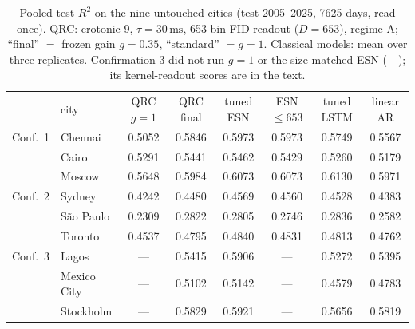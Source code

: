 \documentclass[aps,prresearch,preprint,superscriptaddress,amsmath,amssymb,floatfix]{revtex4-2}
\newcommand{\SI}[2]{\ensuremath{#1\,\mathrm{#2}}}
\begin{document}
\begin{table}[t]
\caption{\label{tab:confirmR2}Pooled test $R^2$ on the nine untouched cities (test
2005--2025, 7625 days, read once). QRC: crotonic-9, $\tau=\SI{30}{ms}$, 653-bin FID
readout ($D=653$), regime A; ``final'' $=$ frozen gain $g=0.35$, ``standard'' $=g=1$.
Classical models: mean over three replicates. Confirmation 3 did not run $g=1$ or the
size-matched ESN (---); its kernel-readout scores are in the text.}
\footnotesize\setlength{\tabcolsep}{4pt}
\begin{ruledtabular}
\begin{tabular}{llcccccc}
 & city & QRC $g=1$ & QRC final & tuned ESN & ESN $\le653$ & tuned LSTM & linear AR \\ \colrule
Conf.\ 1 & Chennai   & 0.5052 & 0.5846 & 0.5973 & 0.5973 & 0.5749 & 0.5567 \\
         & Cairo     & 0.5291 & 0.5441 & 0.5462 & 0.5429 & 0.5260 & 0.5179 \\
         & Moscow    & 0.5648 & 0.5984 & 0.6073 & 0.6073 & 0.6130 & 0.5971 \\ \colrule
Conf.\ 2 & Sydney    & 0.4242 & 0.4480 & 0.4569 & 0.4560 & 0.4528 & 0.4383 \\
         & S\~{a}o Paulo & 0.2309 & 0.2822 & 0.2805 & 0.2746 & 0.2836 & 0.2582 \\
         & Toronto   & 0.4537 & 0.4795 & 0.4840 & 0.4831 & 0.4813 & 0.4762 \\ \colrule
Conf.\ 3 & Lagos     & --- & 0.5415 & 0.5906 & --- & 0.5272 & 0.5395 \\
         & Mexico City & --- & 0.5102 & 0.5142 & --- & 0.4579 & 0.4783 \\
         & Stockholm & --- & 0.5829 & 0.5921 & --- & 0.5656 & 0.5819 \\
\end{tabular}
\end{ruledtabular}
\end{table}
\end{document}
